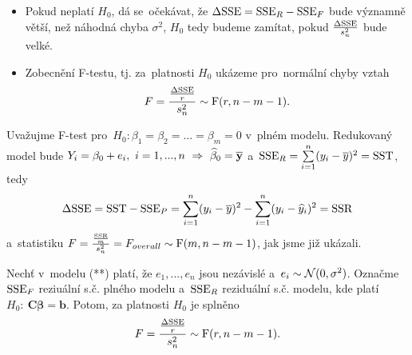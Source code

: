 \begin{itemize}
	\item Pokud neplatí $H_0$, dá se~očekávat, že $\Delta\mathrm{SSE}=\mathrm{SSE}_R-\mathrm{SSE}_F$ bude významně větší, než náhodná chyba $\sigma^2$, $H_0$ tedy budeme zamítat, pokud $\frac{\Delta\mathrm{SSE}}{s_n^2}$ bude velké.
	\item Zobecnění F-testu, tj. za~platnosti $H_0$ ukázeme pro~normální chyby vztah 
	$$ F=\frac{\frac{\Delta\mathrm{SSE}}{r}}{s_n^2}\sim\mathrm{F}(r,n-m-1).$$
\end{itemize}
\begin{example}
	Uvažujme F-test pro~$H_0:\beta_1=\beta_2=...=\beta_m=0$ v~plném modelu. Redukovaný model bude $Y_i=\beta_0+e_i,~i=1,...,n~\Rightarrow~\widehat{\beta}_0=\overline{\textbf{y}}$ a~$\mathrm{SSE}_R=\sum\limits_{i=1}^{n}(y_i-\overline{y})^2=\mathrm{SST}$, tedy 
	$$ \Delta \mathrm{SSE}=\mathrm{SST}-\mathrm{SSE}_P=\sum\limits_{i=1}^{n}(y_i-\overline{y})^2-\sum\limits_{i=1}^{n}(y_i-\widehat{y}_i)^2=\mathrm{SSR}$$
	 a~statistiku $F=\frac{\frac{\mathrm{SSR}}{m}}{s_n^2}=F_{overall}\sim\mathrm{F}(m,n-m-1)$, jak jsme již ukázali.
\end{example}
\begin{theorem}
	Nechť v~modelu (**) platí, že $e_1,...,e_n$ jsou nezávislé a~$e_i\sim\mathcal{N}(0,\sigma^2)$. Označme $\mathrm{SSE}_F$ reziuální s.č. plného modelu a~$\mathrm{SSE}_R$ reziduální s.č. modelu, kde platí $H_0:~\textbf{C}\boldsymbol{\beta}=\textbf{b}$. Potom, za platnosti $H_0$ je splněno
	$$ F=\frac{\frac{\Delta\mathrm{SSE}}{r}}{s_n^2}\sim\mathrm{F}(r,n-m-1).$$
\end{theorem}